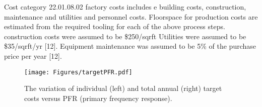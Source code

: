 Cost category 22.01.08.02 factory costs includes e building costs, construction, maintenance and utilities and
personnel costs. Floorspace for production costs are estimated from the required tooling for each of the above process steps. construction costs were assumed to be \$250/sqrft Utilities were assumed to
be \$35/sqrft/yr [12]. Equipment maintenance was assumed to be 5\% of the
purchase price per year [12]. 

\begin{figure}
    \centering
    \texttt{[image: Figures/targetPFR.pdf]}
    \caption{The variation of individual (left) and total annual (right) target costs versus PFR (primary frequency response).}
    \label{fig:targetPFR}
\end{figure}



\begin{table}[h]
\centering
{}
\caption{Target factory costs and requirements.}
\label{tab:tfactory}
\end{table}





